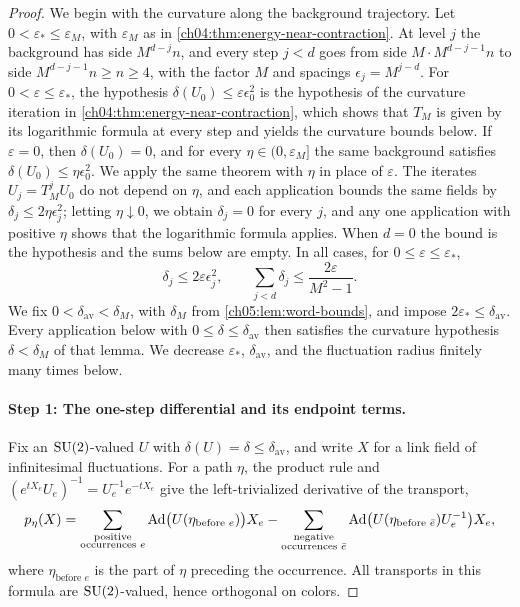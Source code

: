 \begin{proof}
We begin with the curvature along the background trajectory. Let $0<\varepsilon_*\le\varepsilon_M$, with $\varepsilon_M$ as in \cref{ch04:thm:energy-near-contraction}. At level $j$ the background has side $M^{d-j}n$, and every step $j<d$ goes from side $M\cdot M^{d-j-1}n$ to side $M^{d-j-1}n\ge n\ge4$, with the factor $M$ and spacings $\epsilon_j=M^{j-d}$. For $0<\varepsilon\le\varepsilon_*$, the hypothesis $\delta(U_0)\le\varepsilon\epsilon_0^2$ is the hypothesis of the curvature iteration in \cref{ch04:thm:energy-near-contraction}, which shows that $T_M$ is given by its logarithmic formula at every step and yields the curvature bounds below. If $\varepsilon=0$, then $\delta(U_0)=0$, and for every $\eta\in(0,\varepsilon_M]$ the same background satisfies $\delta(U_0)\le\eta\epsilon_0^2$. We apply the same theorem with $\eta$ in place of $\varepsilon$. The iterates $U_j=T_M^jU_0$ do not depend on $\eta$, and each application bounds the same fields by $\delta_j\le2\eta\epsilon_j^2$; letting $\eta\downarrow0$, we obtain $\delta_j=0$ for every $j$, and any one application with positive $\eta$ shows that the logarithmic formula applies. When $d=0$ the bound is the hypothesis and the sums below are empty. In all cases, for $0\le\varepsilon\le\varepsilon_*$,
\begin{equation}\label{ch05:eq:curvature-sum}
 \delta_j\le2\varepsilon\epsilon_j^2,\qquad\sum_{j<d}\delta_j\le\frac{2\varepsilon}{M^2-1}.
\end{equation}
We fix $0<\delta_{\mathrm{av}}<\delta_M$, with $\delta_M$ from \cref{ch05:lem:word-bounds}, and impose $2\varepsilon_*\le\delta_{\mathrm{av}}$. Every application below with $0\le\delta\le\delta_{\mathrm{av}}$ then satisfies the curvature hypothesis $\delta<\delta_M$ of that lemma. We decrease $\varepsilon_*$, $\delta_{\mathrm{av}}$, and the fluctuation radius finitely many times below.

\paragraph{Step 1: The one-step differential and its endpoint terms.}
Fix an $\mathrm{SU}(2)$-valued $U$ with $\delta(U)=\delta\le\delta_{\mathrm{av}}$, and write $X$ for a link field of infinitesimal fluctuations. For a path $\eta$, the product rule and $(e^{tX_e}U_e)^{-1}=U_e^{-1}e^{-tX_e}$ give the left-trivialized derivative of the transport,
\[
 p_\eta(X)=\sum_{\substack{\text{positive}\\\text{occurrences }e}}\operatorname{Ad}\bigl(U(\eta_{\text{before }e})\bigr)X_e-\sum_{\substack{\text{negative}\\\text{occurrences }\bar e}}\operatorname{Ad}\bigl(U(\eta_{\text{before }\bar e})U_e^{-1}\bigr)X_e,
\]
where $\eta_{\text{before }e}$ is the part of $\eta$ preceding the occurrence. All transports in this formula are $\mathrm{SU}(2)$-valued, hence orthogonal on colors.


\end{proof}

